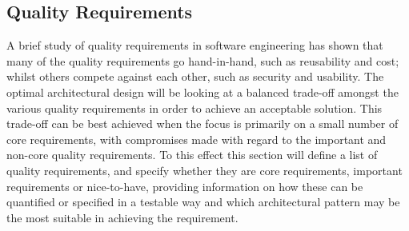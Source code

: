 \documentclass[a4paper]{article}
\begin{document}
\subsection{Quality Requirements}
A brief study of quality requirements in software engineering has shown that many of the quality requirements go hand-in-hand, such as reusability and cost; whilst others compete against each other, such as security and usability. The optimal architectural design will be looking at a balanced trade-off amongst the various quality requirements in order to achieve an acceptable solution.  This trade-off can be best achieved when the focus is primarily on a small number of core requirements, with compromises made with regard to the important and non-core quality requirements. To this effect this section will define a list of quality requirements, and specify whether they are core requirements, important requirements or nice-to-have, providing information on how these can be quantified or specified in a testable way and which architectural pattern may be the most suitable in achieving the requirement.
\end{document}
